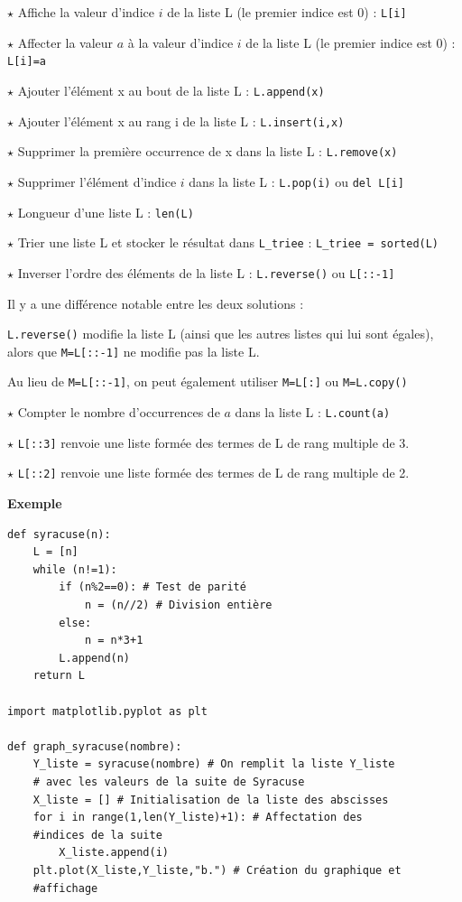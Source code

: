 $\star$ Affiche la valeur d'indice $i$ de la liste L (le premier indice est 0) :
\verb!L[i]!

$\star$ Affecter la valeur $a$ à la valeur d'indice $i$ de la liste L (le premier indice est 0) :
\verb!L[i]=a!

$\star$ Ajouter l'élément x au bout de la liste L :
\verb!L.append(x)!

$\star$ Ajouter l'élément x au rang i de la liste L :
\verb!L.insert(i,x)!

$\star$ Supprimer la première occurrence de x dans la
liste L : \verb!L.remove(x)!

$\star$ Supprimer l'élément d'indice $i$ dans la liste L :
\verb!L.pop(i)! ou \verb!del L[i]!

$\star$ Longueur d'une liste L :
\verb!len(L)!

$\star$ Trier une liste L et stocker le résultat dans
\verb!L_triee! :
\verb!L_triee = sorted(L)!

$\star$ Inverser l'ordre des éléments de la liste L :
\verb!L.reverse()! ou  \verb~L[::-1]~

\danger Il y a une différence notable entre les deux solutions :

\verb!L.reverse()! modifie la liste L (ainsi que les autres listes qui lui sont égales), alors que
\verb~M=L[::-1]~ ne modifie pas la liste L.

Au lieu de \verb!M=L[::-1]!, on peut également utiliser 
\verb!M=L[:]! ou \verb!M=L.copy()!

$\star$ Compter le nombre d'occurrences de $a$ dans la liste L :
\verb!L.count(a)!

$\star$ \verb!L[::3]! renvoie une liste formée des termes de L de rang multiple de 3.

$\star$ \verb!L[::2]! renvoie une liste formée des termes de L de rang multiple de 2.

\medskip

\textbf{\large Exemple}

\begin{lstlisting}
def syracuse(n):
    L = [n]
    while (n!=1):
        if (n%2==0): # Test de parité
            n = (n//2) # Division entière
        else:
            n = n*3+1
        L.append(n)
    return L

import matplotlib.pyplot as plt

def graph_syracuse(nombre):
    Y_liste = syracuse(nombre) # On remplit la liste Y_liste
    # avec les valeurs de la suite de Syracuse
    X_liste = [] # Initialisation de la liste des abscisses
    for i in range(1,len(Y_liste)+1): # Affectation des 
    #indices de la suite
        X_liste.append(i)
    plt.plot(X_liste,Y_liste,"b.") # Création du graphique et 
    #affichage
\end{lstlisting}

